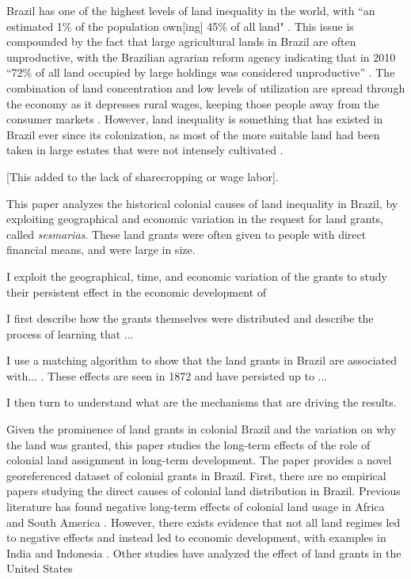 \documentclass{article}
\begin{document}
Brazil has one of the highest levels of land inequality in the world, with ``an estimated 1\% of the population own[ing] 45\% of all land" \parencite{Usaid2016-xs}. 
This issue is compounded by the fact that large agricultural lands in Brazil are often unproductive, with the Brazilian agrarian reform agency indicating that in 2010 ``72\% of all land occupied by large holdings was considered unproductive'' \parencite{Carlson2019-mk}.
The combination of land concentration and low levels of utilization are spread through the economy as it depresses rural wages, keeping those people away from the consumer markets \parencite[p.~1]{De_Oliveira_Andrade1980-xz}.
However, land inequality is something that has existed in Brazil ever since its colonization, as most of the more suitable land had been taken in large estates that were not intensely cultivated \parencite[p.~53]{Mueller1995-gi}. 

[This added to the lack of sharecropping or wage labor].

This paper analyzes the historical colonial causes of land inequality in Brazil, by exploiting geographical and economic variation in the request for land grants, called \textit{sesmarias}. 
These land grants were often given to people with direct financial means, and were large in size. 

I exploit the geographical, time, and economic variation of the grants to study their persistent effect in the economic development of

I first describe how the grants themselves were distributed and describe the process of learning that ...

I use a matching algorithm to show that the land grants in Brazil are associated with... . These effects are seen in 1872 and have persisted up to ... 

I then turn to understand what are the mechanisms that are driving the results. 

Given the prominence of land grants in colonial Brazil and the variation on why the land was granted, this paper studies the long-term effects of the role of colonial land assignment in long-term development.  
The paper provides a novel georeferenced dataset of colonial grants in Brazil. 
First, there are no empirical papers studying the direct causes of colonial land distribution in Brazil. 
Previous literature has found negative long-term effects of colonial land usage in Africa and South America \parencites{Dell2010-qt}{Lowes2021-ww}. 
However, there exists evidence that not all land regimes led to negative effects and instead led to economic development, with examples in India and Indonesia \parencites{Banerjee2005-ki}{Dell2019-np}{Ratnoo2023-vw}.  
Other studies have analyzed the effect of land grants in the United States \parencites{Akee2014-uw}{Allen2019-kh}{Smith2023-ip}
\end{document}
